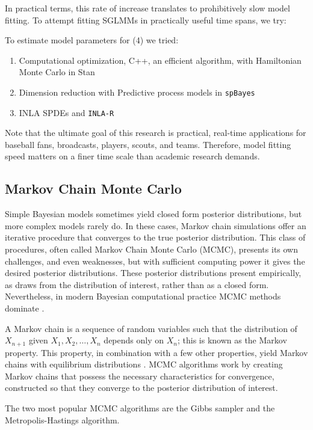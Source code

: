 In practical terms, this rate of increase translates to prohibitively slow model fitting. To attempt fitting SGLMMs in practically useful time spans, we try: 

To estimate model parameters for (4) we tried:
\begin{enumerate}
\item Computational optimization, C++, an efficient algorithm, with Hamiltonian Monte Carlo in Stan
\item Dimension reduction with Predictive process models in \verb|spBayes|
\item INLA SPDEs and \verb|INLA-R|
\end{enumerate}

Note that the ultimate goal of this research is practical, real-time applications for baseball fans, broadcasts, players, scouts, and teams. Therefore, model fitting speed matters on a finer time scale than academic research demands.  

\subsection{Markov Chain Monte Carlo}

Simple Bayesian models sometimes yield closed form posterior distributions, but more complex models rarely do. In these cases, Markov chain simulations offer an iterative procedure that converges to the true posterior distribution. This class of procedures, often called Markov Chain Monte Carlo (MCMC), presents its own challenges, and even weaknesses, but with sufficient computing power it gives the desired posterior distributions. These posterior distributions present empirically, as draws from the distribution of interest, rather than as a closed form. Nevertheless, in modern Bayesian computational practice MCMC methods dominate \cite{Banerjee2014}.

A Markov chain is a sequence of random variables such that the distribution of $X_{n+1}$ given $X_{1}, X_{2}, \hdots , X_{n}$ depends only on $X_{n}$; this is known as the Markov property. This property, in combination with a few other properties, yield Markov chains with equilibrium distributions \citep{Brooks2011}. MCMC algorithms work by creating Markov chains that possess the necessary characteristics for convergence, constructed so that they converge to the posterior distribution of interest.

The two most popular MCMC algorithms are the Gibbs sampler and the Metropolis-Hastings algorithm.

